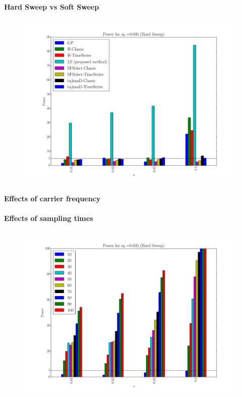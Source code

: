 \documentclass[11pt]{article}
\begin{document}
\paragraph{Hard Sweep vs Soft Sweep}
\begin{figure}
	\centering
	\includegraphics[trim=2.2in 0 2.2in 0 , clip,width=\textwidth]{power}
\end{figure}



\paragraph{Effects of carrier frequency}
\paragraph{Effects of sampling times}
\begin{figure}
	\centering
	\includegraphics[trim=2.2in 0 2.2in 0 , clip,width=\textwidth]{powerTime}
\end{figure}
\end{document}
